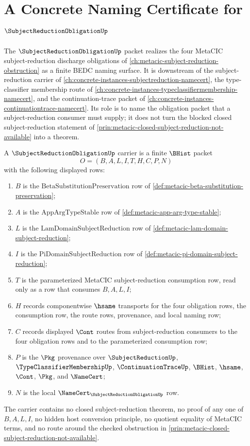 \chapter{A Concrete Naming Certificate for $\SubjectReductionObligationUp$}
\label{ch:concrete-instances-subjectreductionobligation-namecert}

The $\SubjectReductionObligationUp$ packet realizes the four MetaCIC subject-reduction discharge obligations of \autoref{ch:metacic-subject-reduction-obstruction} as a finite BEDC naming surface. It is downstream of the subject-reduction carrier of \autoref{ch:concrete-instances-subjectreduction-namecert}, the type-classifier membership route of \autoref{ch:concrete-instances-typeclassifiermembership-namecert}, and the continuation-trace packet of \autoref{ch:concrete-instances-continuationtrace-namecert}. Its role is to name the obligation packet that a subject-reduction consumer must supply; it does not turn the blocked closed subject-reduction statement of \autoref{prin:metacic-closed-subject-reduction-not-available} into a theorem.

\begin{definition}
\label{def:subject-reduction-obligation-carrier}
A $\SubjectReductionObligationUp$ carrier is a finite $\BHist$ packet
$$
O=(B,A,L,I,T,H,C,P,N)
$$
with the following displayed rows:
\begin{enumerate}
\item $B$ is the $\mathrm{BetaSubstitutionPreservation}$ row of \autoref{def:metacic-beta-substitution-preservation};
\item $A$ is the $\mathrm{AppArgTypeStable}$ row of \autoref{def:metacic-app-arg-type-stable};
\item $L$ is the $\mathrm{LamDomainSubjectReduction}$ row of \autoref{def:metacic-lam-domain-subject-reduction};
\item $I$ is the $\mathrm{PiDomainSubjectReduction}$ row of \autoref{def:metacic-pi-domain-subject-reduction};
\item $T$ is the parameterized MetaCIC subject-reduction consumption row, read only as a row that consumes $B,A,L,I$;
\item $H$ records componentwise $\hsame$ transports for the four obligation rows, the consumption row, the route rows, provenance, and local naming row;
\item $C$ records displayed $\Cont$ routes from subject-reduction consumers to the four obligation rows and to the parameterized consumption row;
\item $P$ is the $\Pkg$ provenance over $\SubjectReductionUp$, $\TypeClassifierMembershipUp$, $\ContinuationTraceUp$, $\BHist$, $\hsame$, $\Cont$, $\Pkg$, and $\NameCert$;
\item $N$ is the local $\NameCert_{\SubjectReductionObligationUp}$ row.
\end{enumerate}
The carrier contains no closed subject-reduction theorem, no proof of any one of $B,A,L,I$, no hidden host conversion principle, no quotient equality of MetaCIC terms, and no route around the checked obstruction in \autoref{prin:metacic-closed-subject-reduction-not-available}.
\end{definition}

